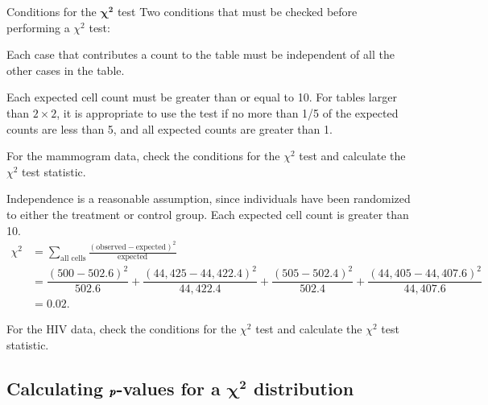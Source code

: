 \begin{onebox}{Conditions for the $\pmb{\chi^2}$ test}
Two conditions that must be checked before performing a $\chi^2$ test:
\begin{description}
\setlength{\itemsep}{0mm}
	\item[Independence.] Each case that contributes a count to the table must be independent of all the other cases in the table.
	\item[Sample size.] Each expected cell count must be greater than or equal to 10. For tables larger than $2 \times 2$, it is appropriate to use the test if no more than 1/5 of the expected counts are less than 5, and all expected counts are greater than 1.
\end{description}
\end{onebox}


\begin{examplewrap}
\begin{nexample}{For the mammogram data, check the conditions for the $\chi^2$ test and calculate the $\chi^2$ test statistic.}

Independence is a reasonable assumption, since individuals have been randomized to either the treatment or control group. Each expected cell count is greater than 10.
\begin{align*}
\chi^2 &= \sum_{\text{all cells}} \frac{(\text{observed} - \text{expected})^2}{\text{expected}} \\
&= \dfrac{(500 - 502.6)^2}{502.6} + \dfrac{(44,425 - 44,422.4)^2}{44,422.4} + \dfrac{(505 - 502.4)^2}{502.4} + \dfrac{(44,405 - 44,407.6)^2}{44,407.6} \\
&=0.02.
\end{align*}	
\end{nexample}
\end{examplewrap}

\begin{exercisewrap}
\begin{nexercise}
For the HIV data, check the conditions for the $\chi^2$ test and calculate the $\chi^2$ test statistic.\footnotemark{}
\end{nexercise}
\end{exercisewrap}


\subsection{Calculating $\pmb{\MakeLowercase{p}}$-values for a $\pmb{\chi^2}$ distribution}

